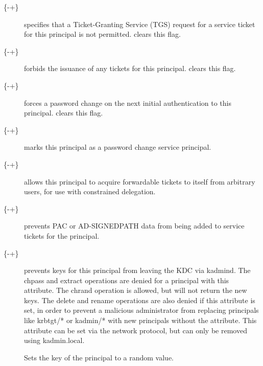 \documentclass[letterpaper,10pt,english]{sphinxmanual}
\begin{document}
\begin{description}
\item[{\{-\textbar{}+\}}] \leavevmode
{} specifies that a Ticket-Granting Service (TGS)
request for a service ticket for this principal is not permitted.
 clears this flag.

\item[{\{-\textbar{}+\}}] \leavevmode
{} forbids the issuance of any tickets for this
principal.   clears this flag.

\item[{\{-\textbar{}+\}}] \leavevmode
{} forces a password change on the next initial
authentication to this principal.   clears this
flag.

\item[{\{-\textbar{}+\}}] \leavevmode
{} marks this principal as a password
change service principal.

\item[{\{-\textbar{}+\}}] \leavevmode
{} allows this principal to acquire
forwardable tickets to itself from arbitrary users, for use with
constrained delegation.

\item[{\{-\textbar{}+\}}] \leavevmode
{} prevents PAC or AD-SIGNEDPATH data from
being added to service tickets for the principal.

\item[{\{-\textbar{}+\}}] \leavevmode
{} prevents keys for this principal from leaving
the KDC via kadmind.  The chpass and extract operations are denied
for a principal with this attribute.  The chrand operation is
allowed, but will not return the new keys.  The delete and rename
operations are also denied if this attribute is set, in order to
prevent a malicious administrator from replacing principals like
krbtgt/* or kadmin/* with new principals without the attribute.
This attribute can be set via the network protocol, but can only
be removed using kadmin.local.

\item[{}] \leavevmode
Sets the key of the principal to a random value.


\end{description}
\end{document}
